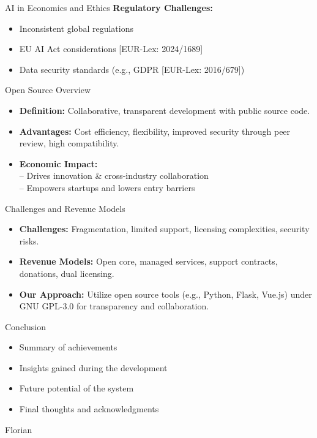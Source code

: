 \documentclass{beamer}
\begin{document}
\begin{frame}{AI in Economics and Ethics}
\textbf{Regulatory Challenges:}
            \begin{itemize}
                \item Inconsistent global regulations 
                \item EU AI Act considerations [EUR-Lex: 2024/1689]
                \item Data security standards (e.g., GDPR [EUR-Lex: 2016/679])
            \end{itemize}
\end{frame}




\begin{frame}{Open Source Overview}
    \begin{itemize}
      \item \textbf{Definition:} Collaborative, transparent development with public source code.
      \item \textbf{Advantages:} Cost efficiency, flexibility, improved security through peer review, high compatibility.
      \item \textbf{Economic Impact:} \\
        \quad -- Drives innovation \& cross-industry collaboration \\
        \quad -- Empowers startups and lowers entry barriers
    \end{itemize}
  \end{frame}
  
  \begin{frame}{Challenges and Revenue Models}
    \begin{itemize}
      \item \textbf{Challenges:} Fragmentation, limited support, licensing complexities, security risks.
      \item \textbf{Revenue Models:} Open core, managed services, support contracts, donations, dual licensing.
      \item \textbf{Our Approach:} Utilize open source tools (e.g., Python, Flask, Vue.js) under GNU GPL-3.0 for transparency and collaboration.
    \end{itemize}
  \end{frame}
  


\begin{frame}{Conclusion}
  \begin{itemize}
    \item Summary of achievements
    \item Insights gained during the development
    \item Future potential of the system
    \item Final thoughts and acknowledgments
  \end{itemize}
\end{frame}

\begin{frame}{Florian}
  
\end{frame}
\end{document}
